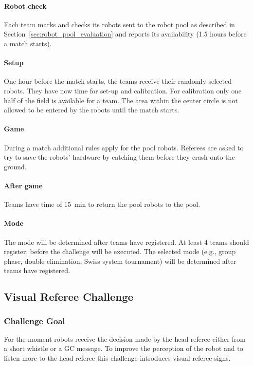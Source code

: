             \paragraph{Robot check} Each team marks and checks its robots sent to the robot pool as described in Section~\ref{sec:robot_pool_evaluation} and reports its availability (1.5 hours before a match starts).
            \paragraph{Setup} One hour before the match starts, the teams receive their randomly selected robots. They have now time for set-up and calibration. For calibration only one half of the field is available for a team. The area within the center circle is not allowed to be entered by the robots until the match starts.
            \paragraph{Game} During a match additional rules apply for the pool robots. Referees are asked to try to save the robots' hardware by catching them before they crash onto the ground.
            \paragraph{After game} Teams have time of \qty{15}{\minute} to return the pool robots to the pool.

        \paragraph{Mode}
            The mode will be determined after teams have registered. At least 4 teams should register, before the challenge will be executed. The selected mode (e.g., group phase, double elimination, Swiss system tournament) will be determined after teams have registered.

\subsection{Visual Referee Challenge}

    \subsubsection{Challenge Goal}

        For the moment robots receive the decision made by the head referee either from a short whistle or a GC message. To improve the perception of the robot and to listen more to the head referee this challenge introduces visual referee signs.

